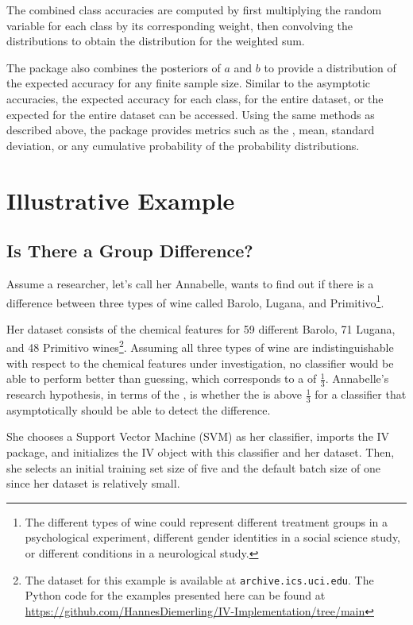 \documentclass[man]{apa7}
\begin{document}
The combined class accuracies are computed by first multiplying the random variable for each class by its corresponding weight, then convolving the distributions to obtain the distribution for the weighted sum.

The package also combines the posteriors of $a$ and $b$ to provide a distribution of the expected accuracy for any finite sample size. Similar to the asymptotic accuracies, the expected accuracy for each class, for the entire dataset, or the expected  for the entire dataset can be accessed. Using the same methods as described above, the package provides metrics such as the , mean, standard deviation, or any cumulative probability of the probability distributions.

\section{Illustrative Example} \label{sec:example}

\subsection{Is There a Group Difference?} \label{sec:ex_group_diff}

Assume a researcher, let’s call her Annabelle, wants to find out if there is a difference between three types of wine called Barolo, Lugana, and Primitivo\footnote{The different types of wine could represent different treatment groups in a psychological experiment, different gender identities in a social science study, or different conditions in a neurological study.}.

Her dataset consists of the chemical features for 59 different Barolo, 71 Lugana, and 48 Primitivo wines\footnote{The dataset for this example is available at \texttt{archive.ics.uci.edu}. The Python code for the examples presented here can be found at \url{https://github.com/HannesDiemerling/IV-Implementation/tree/main}}.
Assuming all three types of wine are indistinguishable with respect to the chemical features under investigation, no classifier would be able to perform better than guessing, which corresponds to a  of $\frac{1}{3}$.
Annabelle’s research hypothesis, in terms of the , is whether the  is above $\frac{1}{3}$ for a classifier that asymptotically should be able to detect the difference.

She chooses a Support Vector Machine (SVM) as her classifier, imports the IV package, and initializes the IV object with this classifier and her dataset.
Then, she selects an initial training set size of five and the default batch size of one since her dataset is relatively small.
\end{document}

